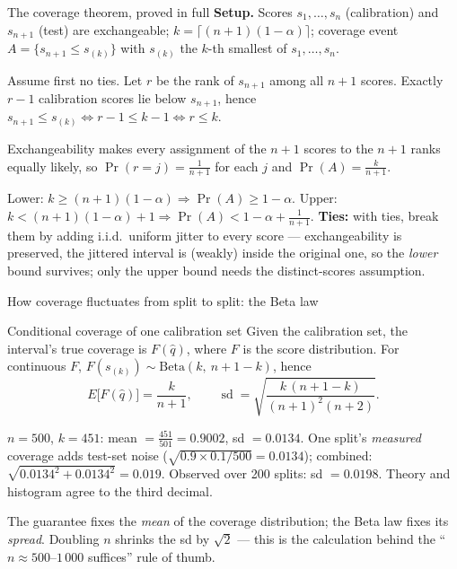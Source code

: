 \documentclass[aspectratio=169,11pt]{beamer}
\begin{document}
\begin{frame}{The coverage theorem, proved in full}
  \footnotesize
  \textbf{Setup.} Scores $s_1, \dots, s_n$ (calibration) and $s_{n+1}$ (test) are
  exchangeable; $k = \lceil (n+1)(1-\alpha) \rceil$; coverage event
  $A = \{s_{n+1} \le s_{(k)}\}$ with $s_{(k)}$ the $k$-th smallest of
  $s_1, \dots, s_n$.
  \begin{readme}
    Assume first no ties. Let $r$ be the rank of $s_{n+1}$ among all $n+1$ scores.
    Exactly $r - 1$ calibration scores lie below $s_{n+1}$, hence
    $s_{n+1} \le s_{(k)} \iff r - 1 \le k - 1 \iff r \le k$.
  \end{readme}
  \begin{readme}
    Exchangeability makes every assignment of the $n+1$ scores to the $n+1$ ranks
    equally likely, so $\Pr(r = j) = \tfrac{1}{n+1}$ for each $j$ and
    $\Pr(A) = \tfrac{k}{n+1}$.
  \end{readme}
  \begin{readme}
    Lower: $k \ge (n+1)(1-\alpha) \Rightarrow \Pr(A) \ge 1 - \alpha$.
    Upper: $k < (n+1)(1-\alpha) + 1 \Rightarrow \Pr(A) < 1 - \alpha + \tfrac{1}{n+1}$.
    \textbf{Ties:} with ties, break them by adding i.i.d.\ uniform jitter to every
    score --- exchangeability is preserved, the jittered interval is (weakly) inside
    the original one, so the \emph{lower} bound survives; only the upper bound needs
    the distinct-scores assumption.
  \end{readme}
\end{frame}

\begin{frame}{How coverage fluctuates from split to split: the Beta law}
  \begin{block}{Conditional coverage of one calibration set}
    Given the calibration set, the interval's true coverage is
    $F(\hat q)$, where $F$ is the score distribution. For continuous $F$,
    $F(s_{(k)}) \sim \text{Beta}(k,\ n + 1 - k)$, hence
    \[
      E\big[F(\hat q)\big] = \frac{k}{n+1}, \qquad
      \operatorname{sd} = \sqrt{\frac{k\,(n+1-k)}{(n+1)^2 (n+2)}}.
    \]
  \end{block}
  \begin{numexample}
    $n = 500$, $k = 451$: mean $= \tfrac{451}{501} = 0.9002$, sd $= 0.0134$. One
    split's \emph{measured} coverage adds test-set noise
    ($\sqrt{0.9 \times 0.1 / 500} = 0.0134$); combined:
    $\sqrt{0.0134^2 + 0.0134^2} = 0.019$. Observed over 200 splits: sd $= 0.0198$.
    Theory and histogram agree to the third decimal.
  \end{numexample}
  \begin{takeaway}
    The guarantee fixes the \emph{mean} of the coverage distribution; the Beta law
    fixes its \emph{spread}. Doubling $n$ shrinks the sd by $\sqrt{2}$ --- this is the
    calculation behind the ``$n \approx 500$--$1\,000$ suffices'' rule of thumb.
  \end{takeaway}
\end{frame}
\end{document}
